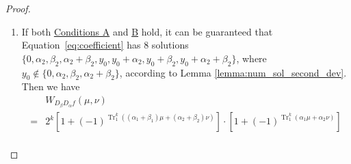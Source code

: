 \documentclass{article}
\newcommand{\F}{\mathbb{F}}
\newcommand{\0}{\textbf{0}}
\newcommand{\1}{\textbf{1}}
\newcommand{\TRACE}{\operatorname{Tr}_1^k}
\theoremstyle{plain}
\begin{document}
\begin{proof}
\begin{enumerate}[label=\textbf{Case \arabic*},wide = 0pt]
            \item If both \hyperref[item_a]{\textsf{Conditions A}} and \hyperref[item_b]{\textsf{B}} hold,\label{case_2}
            it can be guaranteed that Equation~\eqref{eq:coefficient} has $8$ solutions $\{0,\alpha_2,\beta_2,\alpha_2+\beta_2,y_0,y_0+\alpha_2,y_0+\beta_2,y_0+\alpha_2+\beta_2\}$, where $y_0\notin\{0,\alpha_2,\beta_2,\alpha_2+\beta_2\}$, according to Lemma \ref{lemma:num_sol_second_dev}.
            Then we have
            \begin{align*}
            &W_{D_{\beta}D_{\alpha}f}(\mu,\nu)\nonumber\\
                =&2^k\left[1+(-1)^{\TRACE\left((\alpha_1+\beta_1)\mu+ (\alpha_2+\beta_2)\nu\right)}\right]\cdot
                \left[1+(-1)^{\TRACE\left(\alpha_1\mu+\alpha_2\nu\right)}\right]\nonumber\\

\end{align*}
\end{enumerate}
\end{proof}
\end{document}
